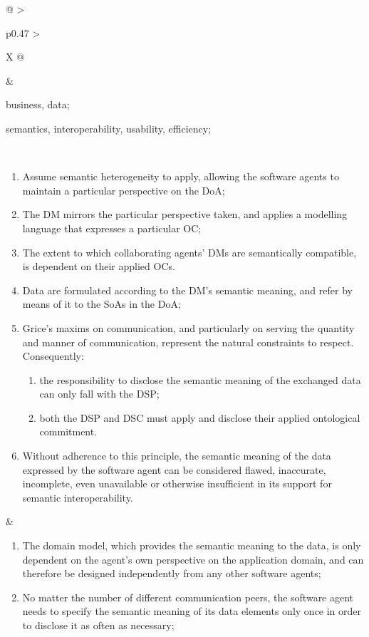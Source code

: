 \begin{xltabular}[l]{\linewidth}{@{} >{\small\raggedright\arraybackslash}p{0.47\linewidth} >{\small\raggedright\arraybackslash}X @{}}
\begin{mmdp}
\end{mmdp}
&
\begin{description}[labelwidth=3.7cm,leftmargin=3.7cm+1ex,nosep,topsep=2ex,labelsep=1ex,font=\bfseries]
  \item[Type of information:] business, data;
  \item[Quality attributes:] semantics, interoperability, usability, efficiency;
\end{description} \\
\begin{enumerate}[left=6pt, nosep]
  \item Assume semantic heterogeneity to apply, allowing the software agents to maintain a particular perspective on the DoA;
  \item The DM mirrors the particular perspective taken, and applies a modelling language that expresses a particular OC;
  \item The extent to which collaborating agents' DMs are semantically compatible, is dependent on their applied OCs. 
  \item Data are formulated according to the DM's semantic meaning, and refer by means of it to the SoAs in the DoA;
  \item Grice’s maxims on communication, and particularly on serving the quantity and manner of communication, represent the natural constraints to respect. Consequently:
  \begin{enumerate}
    \item the responsibility to disclose the semantic meaning of the exchanged data can only fall with the DSP;
    \item both the DSP and DSC must apply and disclose their applied ontological commitment.
  \end{enumerate}
  \item Without adherence to this principle, the semantic meaning of the data expressed by the software agent can be considered flawed, inaccurate, incomplete, even unavailable or otherwise insufficient in its support for semantic interoperability.
\end{enumerate}
&
\begin{enumerate}[left=10pt, nosep]
  \item The domain model, which provides the semantic meaning to the data, is only dependent on the agent's own perspective on the application domain, and can therefore be designed independently from any other software agents;
  \item No matter the number of different communication peers, the software agent needs to specify the semantic meaning of its data elements only once in order to disclose it as often as necessary;

\end{enumerate}
\end{xltabular}
